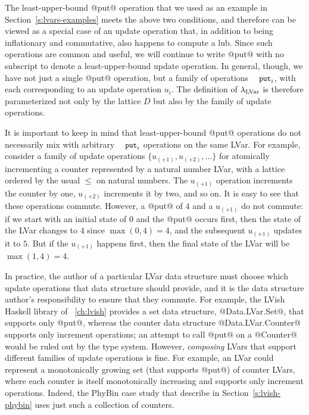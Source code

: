 
The least-upper-bound @put@ operation that we used as an example in
Section~\ref{s:lvars-examples} meets the above two conditions, and
therefore can be viewed as a special case of an update operation that,
in addition to being inflationary and commutative, also happens to
compute a lub.  Since such operations are common and useful, we will
continue to write @put@ with no subscript to denote a
least-upper-bound update operation.  In general, though, we have not
just a single @put@ operation, but a family of operations $\PUTi$,
with each corresponding to an update operation $u_i$.  The definition
of $\lambda_{\textrm{LVar}}$ is therefore parameterized not only by the lattice
$D$ but also by the family of update operations.

It is important to keep in mind that least-upper-bound @put@
operations do not necessarily mix with arbitrary $\PUTi$ operations on
the same LVar.  For example, consider a family of update operations
$\{ u_{(+1)}, u_{(+2)}, \dots \}$ for atomically incrementing a
counter represented by a natural number LVar, with a lattice ordered
by the usual $\leq$ on natural numbers.  The $u_{(+1)}$ operation
increments the counter by one, $u_{(+2)}$ increments it by two, and so
on.  It is easy to see that these operations commute.  However, a
@put@ of $4$ and a $u_{(+1)}$ do not commute: if we start with an
initial state of $0$ and the @put@ occurs first, then the state of the
LVar changes to $4$ since $\max(0, 4) = 4$, and the subsequent
$u_{(+1)}$ updates it to $5$.  But if the $u_{(+1)}$ happens first,
then the final state of the LVar will be $\max(1, 4) = 4$.

In practice, the author of a particular LVar data structure must
choose which update operations that data structure should provide, and
it is the data structure author's responsibility to ensure that they
commute.  For example, the LVish Haskell library of
~\ref{ch:lvish} provides a set data
structure, @Data.LVar.Set@, that supports only @put@, whereas the
counter data structure @Data.LVar.Counter@ supports only increment
operations; an attempt to call @put@ on a @Counter@ would be ruled out
by the type system.  However, \emph{composing} LVars that support
different families of update operations is fine.  For example, an LVar
could represent a monotonically growing set (that supports @put@) of
counter LVars, where each counter is itself monotonically increasing
and supports only increment operations.  Indeed, the PhyBin case study
that  describe in Section~\ref{s:lvish-phybin} uses just
such a collection of counters.

